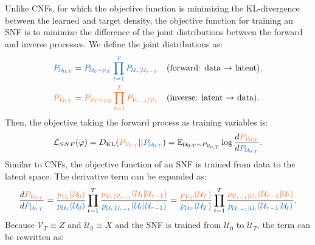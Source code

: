 Unlike \acp{CNF}, for which the objective function is minimizing the KL-divergence between the learned and target density, the objective function for training an \ac{SNF} is to minimize the difference of the joint distributions between the forward and inverse processes. We define the joint distributions as:
\begin{subequations}
\begin{align}
    \textcolor{NavyBlue}{P_{\mathcal{U}_{0:T}}} &= \textcolor{NavyBlue}{P_{\mathcal{U}_0\sim p_X}\prod_{t=1}^{T}P_{\mathcal{U}_{\tau}|\mathcal{U}_{\tau-1}}} && \text{(forward: data $\to$ latent)}, \\
    \textcolor{Orange}{P_{\mathcal{V}_{0:T}}} &= \textcolor{Orange}{P_{\mathcal{V}_T\sim p_Z}\prod_{t=1}^{T}P_{\mathcal{V}_{\tau-1}|\mathcal{V}_\tau}} && \text{(inverse: latent $\to$ data)}.
\end{align}
\end{subequations}
Then, the objective taking the forward process as training variables is:
\begin{equation}
    \mathcal{L}_{SNF}(\varphi)=D_{\text{KL}}(\textcolor{Orange}{P_{\mathcal{V}_{0:T}}}||\textcolor{NavyBlue}{P_{\mathcal{U}_{0:T}}})=\mathbb{E}_{\mathcal{U}_{0:T}\sim P_{\mathcal{V}_{0:T}}}\log \frac{d\textcolor{Orange}{P_{\mathcal{V}_{0:T}}}}{d\textcolor{NavyBlue}{P_{\mathcal{U}_{0:T}}}}.
\end{equation}
Similar to \acp{CNF}, the objective function of an \ac{SNF} is trained from data to the latent space. The derivative term can be expanded as:
\begin{equation}
    \frac{d\textcolor{Orange}{P_{\mathcal{V}_{0:T}}}}{d\textcolor{NavyBlue}{P_{\mathcal{U}_{0:T}}}} = \frac{\textcolor{Orange}{p_{\mathcal{V}_0}(\mathcal{U}_0)}}{\textcolor{NavyBlue}{p_{\mathcal{U}_0}(\mathcal{U}_0)}}\prod_{t=1}^{T}\frac{\textcolor{Orange}{p_{\mathcal{V}_\tau|\mathcal{V}_{\tau-1}}(\mathcal{U}_t|\mathcal{U}_{\tau-1})}}{\textcolor{NavyBlue}{p_{\mathcal{U}_t|\mathcal{U}_{\tau-1}}(\mathcal{U}_t|\mathcal{U}_{\tau-1})}}=\frac{\textcolor{Orange}{p_{\mathcal{V}_T}(\mathcal{U}_T)}}{\textcolor{NavyBlue}{p_{\mathcal{U}_T}(\mathcal{U}_T)}}\prod_{t=1}^{T}\frac{\textcolor{Orange}{p_{\mathcal{V}_{\tau-1}|\mathcal{V}_\tau}(\mathcal{U}_{\tau-1}|\mathcal{U}_t)}}{\textcolor{NavyBlue}{p_{\mathcal{U}_{\tau-1}|\mathcal{U}_t}(\mathcal{U}_{\tau-1}|\mathcal{U}_t)}}.
\end{equation}
Because $\mathcal{V}_T\equiv Z$ and $\mathcal{U}_0\equiv X$ and the SNF is trained from $\mathcal{U}_0$ to $\mathcal{U}_T$, the term can be rewritten as:

